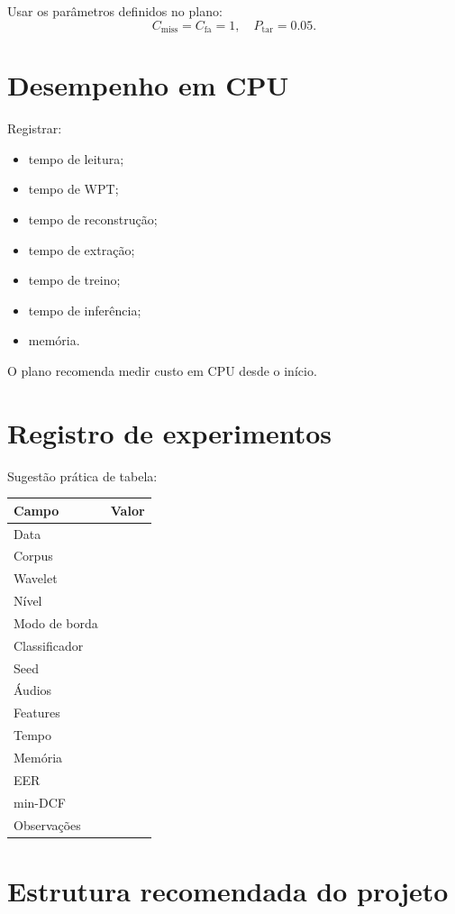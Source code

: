 \documentclass[12pt,a4paper]{article}
\begin{document}
Usar os parâmetros definidos no plano:
\[
C_{\mathrm{miss}}=C_{\mathrm{fa}}=1,\quad P_{\mathrm{tar}}=0.05.
\]

\section{Desempenho em CPU}

Registrar:
\begin{itemize}
\item tempo de leitura;
\item tempo de WPT;
\item tempo de reconstrução;
\item tempo de extração;
\item tempo de treino;
\item tempo de inferência;
\item memória.
\end{itemize}

O plano recomenda medir custo em CPU desde o início.

\section{Registro de experimentos}

Sugestão prática de tabela:

\begin{center}
\begin{tabular}{ll}
\toprule
Campo & Valor\\
\midrule
Data & \\
Corpus & \\
Wavelet & \\
Nível & \\
Modo de borda & \\
Classificador & \\
Seed & \\
Áudios & \\
Features & \\
Tempo & \\
Memória & \\
EER & \\
min-DCF & \\
Observações & \\
\bottomrule
\end{tabular}
\end{center}

\section{Estrutura recomendada do projeto}
\end{document}
